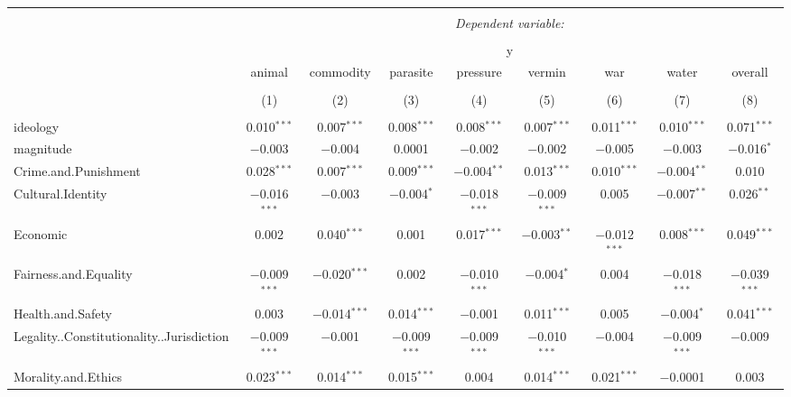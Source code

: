 
\begin{table}[!htbp] \centering 
  \caption{} 
  \label{} 
\begin{tabular}{@{\extracolsep{5pt}}lcccccccc} 
\\[-1.8ex]\hline 
\hline \\[-1.8ex] 
 & \multicolumn{8}{c}{\textit{Dependent variable:}} \\ 
\cline{2-9} 
\\[-1.8ex] & \multicolumn{8}{c}{y} \\ 
 & animal & commodity & parasite & pressure & vermin & war & water & overall \\ 
\\[-1.8ex] & (1) & (2) & (3) & (4) & (5) & (6) & (7) & (8)\\ 
\hline \\[-1.8ex] 
 ideology & 0.010$^{***}$ & 0.007$^{***}$ & 0.008$^{***}$ & 0.008$^{***}$ & 0.007$^{***}$ & 0.011$^{***}$ & 0.010$^{***}$ & 0.071$^{***}$ \\ 
  magnitude & $-$0.003 & $-$0.004 & 0.0001 & $-$0.002 & $-$0.002 & $-$0.005 & $-$0.003 & $-$0.016$^{*}$ \\ 
  Crime.and.Punishment & 0.028$^{***}$ & 0.007$^{***}$ & 0.009$^{***}$ & $-$0.004$^{**}$ & 0.013$^{***}$ & 0.010$^{***}$ & $-$0.004$^{**}$ & 0.010 \\ 
  Cultural.Identity & $-$0.016$^{***}$ & $-$0.003 & $-$0.004$^{*}$ & $-$0.018$^{***}$ & $-$0.009$^{***}$ & 0.005 & $-$0.007$^{**}$ & 0.026$^{**}$ \\ 
  Economic & 0.002 & 0.040$^{***}$ & 0.001 & 0.017$^{***}$ & $-$0.003$^{**}$ & $-$0.012$^{***}$ & 0.008$^{***}$ & 0.049$^{***}$ \\ 
  Fairness.and.Equality & $-$0.009$^{***}$ & $-$0.020$^{***}$ & 0.002 & $-$0.010$^{***}$ & $-$0.004$^{*}$ & 0.004 & $-$0.018$^{***}$ & $-$0.039$^{***}$ \\ 
  Health.and.Safety & 0.003 & $-$0.014$^{***}$ & 0.014$^{***}$ & $-$0.001 & 0.011$^{***}$ & 0.005 & $-$0.004$^{*}$ & 0.041$^{***}$ \\ 
  Legality..Constitutionality..Jurisdiction & $-$0.009$^{***}$ & $-$0.001 & $-$0.009$^{***}$ & $-$0.009$^{***}$ & $-$0.010$^{***}$ & $-$0.004 & $-$0.009$^{***}$ & $-$0.009 \\ 
  Morality.and.Ethics & 0.023$^{***}$ & 0.014$^{***}$ & 0.015$^{***}$ & 0.004 & 0.014$^{***}$ & 0.021$^{***}$ & $-$0.0001 & 0.003 \\ 

\end{tabular}
\end{table}
